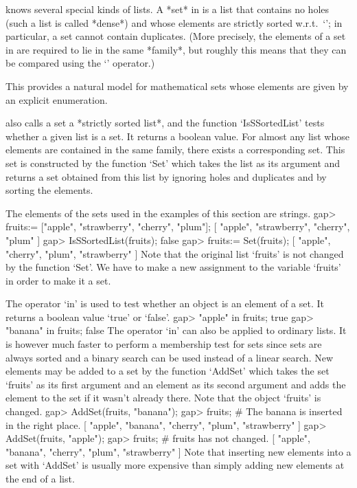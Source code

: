 
{\GAP} knows several special kinds of lists.  A *set* in {\GAP} is a
list that contains no holes (such a list is called *dense*) and whose
elements are strictly sorted w.r.t.~`\<'; in particular, a set cannot
contain duplicates.  (More precisely, the elements of a set in {\GAP}
are required to lie in the same *family*, but roughly this means that
they can be compared using the `\<' operator.)

This provides a natural model for mathematical sets whose elements are
given by an explicit enumeration.

{\GAP} also calls a set a *strictly sorted list*, and the function
`IsSSortedList' tests whether a given list is a set.  It returns a
boolean value.  For almost any list whose elements are contained in
the same family, there exists a corresponding set.  This set is
constructed by the function `Set' which takes the list as its argument
and returns a set obtained from this list by ignoring holes and
duplicates and by sorting the elements.

The elements of the sets used in the examples of this section are
strings.
\beginexample
gap> fruits:= ["apple", "strawberry", "cherry", "plum"];
[ "apple", "strawberry", "cherry", "plum" ]
gap> IsSSortedList(fruits);
false
gap> fruits:= Set(fruits);
[ "apple", "cherry", "plum", "strawberry" ]
\endexample
Note that the original list `fruits' is not changed by the function
`Set'.  We have to make a new assignment to the variable `fruits' in
order to make it a set.

The operator `in' is  used  to test whether an  object is an element of a
set.  It returns a boolean value `true' or `false'.
\beginexample
gap> "apple" in fruits;
true
gap> "banana" in fruits;
false
\endexample
The operator `in' can also be applied to ordinary lists. It is however
much  faster  to perform  a  membership test for   sets since sets are
always  sorted and a  binary search  can be  used  instead of a linear
search.  New elements  may be added to a  set by the function `AddSet'
which takes the  set `fruits' as its first  argument and an element as
its second argument   and adds the element  to  the set  if  it wasn't
already there. Note that the object `fruits' is changed.
\beginexample
gap> AddSet(fruits, "banana");
gap> fruits;  #  The banana is inserted in the right place.
[ "apple", "banana", "cherry", "plum", "strawberry" ]
gap> AddSet(fruits, "apple");
gap> fruits;  #  fruits has not changed.
[ "apple", "banana", "cherry", "plum", "strawberry" ]
\endexample
Note that inserting new elements into a set with `AddSet' is usually more
expensive than simply adding new elements at the end of a list.

